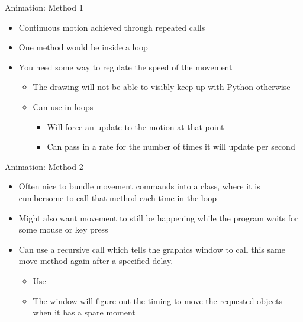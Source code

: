 \documentclass[pdf, aspectratio=169, 12pt]{beamer}
\begin{document}
\begin{frame}{Animation: Method 1}
	\begin{itemize}
		\item Continuous motion achieved through repeated  calls
		\item One method would be inside a loop
		\item You \alert{need} some way to regulate the speed of the movement
			\begin{itemize}
				\item The drawing will not be able to visibly keep up with Python otherwise
				\item Can use  in loops
					\begin{itemize}
						\item Will force an update to the motion at that point
						\item Can pass in a rate for the number of times it will update per second
					\end{itemize}
			\end{itemize}
	\end{itemize}
\end{frame}

\begin{frame}{Animation: Method 2}
	\begin{itemize}
		\item Often nice to bundle movement commands into a class, where it is cumbersome to call that method each time in the loop
		\item Might also want movement to still be happening while the program waits for some mouse or key press
		\item Can use a recursive call which tells the graphics window to call this same move method again after a specified delay.
			\begin{itemize}
				\item Use 
				\item The window will figure out the timing to move the requested objects when it has a spare moment
			\end{itemize}
	\end{itemize}
\end{frame}
\end{document}
